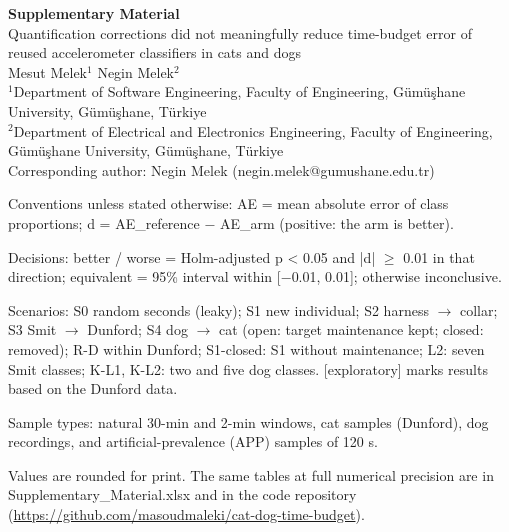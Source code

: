 \documentclass[10pt,a4paper]{article}
\begin{document}
\begin{center}
{\Large\bfseries Supplementary Material}\\[6pt]
{\large Quantification corrections did not meaningfully reduce time-budget error of reused accelerometer classifiers in cats and dogs}\\[8pt]
Mesut Melek$^{1}$ \quad Negin Melek$^{2}$\\[4pt]
{\small $^{1}$Department of Software Engineering, Faculty of Engineering, Gümüşhane University, Gümüşhane, Türkiye\\ $^{2}$Department of Electrical and Electronics Engineering, Faculty of Engineering, Gümüşhane University, Gümüşhane, Türkiye\\[2pt]
Corresponding author: Negin Melek (negin.melek@gumushane.edu.tr)}
\end{center}
\medskip
{\small
Conventions unless stated otherwise: AE = mean absolute error of class proportions; d = AE\_reference $-$ AE\_arm (positive: the arm is better).\par\smallskip
Decisions: better / worse = Holm-adjusted p < 0.05 and |d| $\geq$ 0.01 in that direction; equivalent = 95\% interval within [$-$0.01, 0.01]; otherwise inconclusive.\par\smallskip
Scenarios: S0 random seconds (leaky); S1 new individual; S2 harness $\rightarrow$ collar; S3 Smit $\rightarrow$ Dunford; S4 dog $\rightarrow$ cat (open: target maintenance kept; closed: removed); R-D within Dunford; S1-closed: S1 without maintenance; L2: seven Smit classes; K-L1, K-L2: two and five dog classes. [exploratory] marks results based on the Dunford data.\par\smallskip
Sample types: natural 30-min and 2-min windows, cat samples (Dunford), dog recordings, and artificial-prevalence (APP) samples of 120 s.\par\smallskip
Values are rounded for print. The same tables at full numerical precision are in Supplementary\_Material.xlsx and in the code repository (\url{https://github.com/masoudmaleki/cat-dog-time-budget}).\par}
\end{document}
